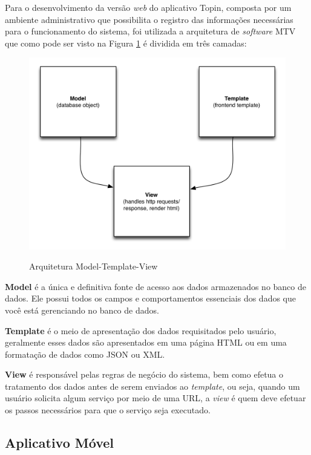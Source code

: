 {{{{Para o desenvolvimento da versão \textit{web} do aplicativo Topin, composta por um ambiente administrativo que possibilita o registro das informações necessárias para o funcionamento do sistema, foi utilizada a arquitetura de \textit{software} MTV que como pode ser visto na Figura \ref{fig:model-template-view} é dividida em três camadas:

\begin{figure}[H]
\caption{Arquitetura Model-Template-View}
\centering
\includegraphics[width=.7\textwidth]{imagens/model-template-view.png}
\label{fig:model-template-view}
\end{figure}

\begin{lista}
\item \textbf{Model} é a única e definitiva fonte de acesso aos dados armazenados no banco de dados. Ele possui todos os campos e comportamentos essenciais dos dados que você está gerenciando no banco de dados.
\item \textbf{Template} é o meio de apresentação dos dados requisitados pelo usuário, geralmente esses dados são apresentados em uma página HTML ou em uma formatação de dados como JSON ou XML.
\item \textbf{View} é responsável pelas regras de negócio do sistema, bem como efetua o tratamento dos dados antes de serem enviados ao \textit{template}, ou seja, quando um usuário solicita algum serviço por meio de uma URL, a \textit{view} é quem deve efetuar os passos necessários para que o serviço seja executado.
\end{lista}

\subsection{Aplicativo Móvel}

}}}}
